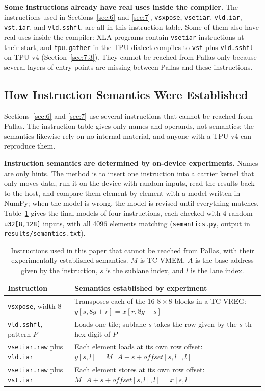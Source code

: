 \documentclass[sigconf,nonacm,balance=false]{acmart}
\newcommand{\code}[1]{\texttt{#1}}
\begin{document}
\textbf{Some instructions already have real uses inside the compiler.} The instructions used in Sections~\ref{sec:6} and \ref{sec:7}, \code{vsxpose}, \code{vsetiar}, \code{vld.\allowbreak{}iar}, \code{vst.\allowbreak{}iar}, and \code{vld.\allowbreak{}sshfl}, are all in this instruction table. Some of them also have real uses inside the compiler: XLA programs contain \code{vsetiar} instructions at their start, and \code{tpu.\allowbreak{}gather} in the TPU dialect compiles to \code{vst} plus \code{vld.\allowbreak{}sshfl} on TPU v4 (Section~\ref{sec:7.3}). They cannot be reached from Pallas only because several layers of entry points are missing between Pallas and these instructions.

\subsection{How Instruction Semantics Were Established}
\label{sec:3.2}

Sections~\ref{sec:6} and \ref{sec:7} use several instructions that cannot be reached from Pallas. The instruction table gives only names and operands, not semantics; the semantics likewise rely on no internal material, and anyone with a TPU v4 can reproduce them.

\textbf{Instruction semantics are determined by on-device experiments.} Names are only hints. The method is to insert one instruction into a carrier kernel that only moves data, run it on the device with random inputs, read the results back to the host, and compare them element by element with a model written in NumPy; when the model is wrong, the model is revised until everything matches. Table~\ref{tab:2} gives the final models of four instructions, each checked with 4 random \code{u32[8,\allowbreak{}128]} inputs, with all 4096 elements matching (\code{semantics.\allowbreak{}py}, output in \code{results/\allowbreak{}semantics.\allowbreak{}txt}).

\begin{table}
\centering
\caption{Instructions used in this paper that cannot be reached from Pallas, with their experimentally established semantics. $M$ is TC VMEM, $A$ is the base address given by the instruction, $s$ is the sublane index, and $l$ is the lane index.}
\label{tab:2}
\begin{tabular}{ll}
\toprule
Instruction & Semantics established by experiment \\
\midrule
\code{vsxpose}, width 8 & Transposes each of the 16 $8 \times 8$ blocks in a TC VREG: $y[s, 8g+r] = x[r, 8g+s]$ \\
\code{vld.\allowbreak{}sshfl}, pattern $P$ & Loads one tile; sublane $s$ takes the row given by the $s$-th hex digit of $P$ \\
\code{vsetiar.\allowbreak{}raw} plus \code{vld.\allowbreak{}iar} & Each element loads at its own row offset: $y[s, l] = M[A + s + \mathit{offset}[s, l], l]$ \\
\code{vsetiar.\allowbreak{}raw} plus \code{vst.\allowbreak{}iar} & Each element stores at its own row offset: $M[A + s + \mathit{offset}[s, l], l] = x[s, l]$ \\
\bottomrule
\end{tabular}
\end{table}
\end{document}
